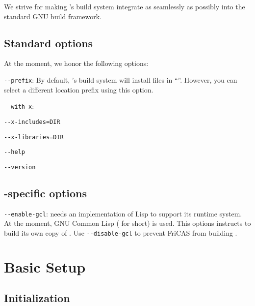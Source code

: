 \documentclass[12pt]{article}
\begin{document}
We strive for making 's build system integrate as seamlessly as
possibly into the standard GNU build framework.

\subsection{Standard options}
\label{sec:config-options:std}

At the moment, we honor the following options:
\begin{description}
\item \verb!--prefix!:
  By default, 's build system will install files
  in ``''.  However, you
  can select a different location prefix using this option.

\item \verb!--with-x!:

\item \verb!--x-includes=DIR!

\item \verb!--x-libraries=DIR!

\item \verb!--help!

\item \verb!--version!
\end{description}


\subsection{-specific options}
\label{sec:config-options:fricas-specific}

\begin{description}
\item \verb!--enable-gcl!:
   needs an implementation of Lisp to support its
  runtime system.  At the moment, GNU Common Lisp ( for short)
  is used.  This options instructs  to build its own copy
  of .  Use \verb!--disable-gcl! to prevent FriCAS
  from building .
\end{description}

\section{Basic Setup}
\label{sec:basic-setup}

\subsection{ Initialization}
\label{sec:basic-setup:init}
\end{document}
